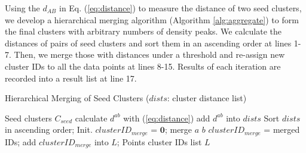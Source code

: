 \documentclass{llncs}
\begin{document}
Using the $d_{AB}$ in Eq. (\ref{eq:distance}) to measure the distance of two seed clusters, we develop a hierarchical merging algorithm (Algorithm \ref{alg:aggregate}) to form the final clusters with arbitrary numbers of density peaks. We calculate the distances of pairs of seed clusters and sort them in an ascending order at lines 1-7. Then, we merge those with distances under a threshold and re-assign new cluster IDs to all the data points at lines 8-15. Results of each iteration are recorded into a result list at line 17. 
%
\begin{algorithm}[htb] 
\caption{Hierarchical Merging of Seed Clusters ($dists$: cluster distance list)} 
\vspace*{-.4cm}
\begin{multicols}{2}
\label{alg:aggregate} 
\begin{algorithmic}[1] 
\Require 
Seed clusters $C_{seed}$
\State calculate $d^{ab}$ with (\ref{eq:distance})
\State add $d^{ab}$ into $dists$
\EndIf 
\EndFor
\State Sort $dists$ in ascending order;
\State Init. $clusterID_{merge}$ = $\bm{0}$;
 merge $a$ $b$ 
\EndIf 
\EndFor
\State $clusterID_{merge}$ = merged IDs;
\State add $clusterID_{merge}$ into $L$;
\EndFor
\Ensure 
Points cluster IDs list $L$ 
\end{algorithmic} 
\end{multicols}
\vspace*{-.4cm}
\end{algorithm}
\end{document}
